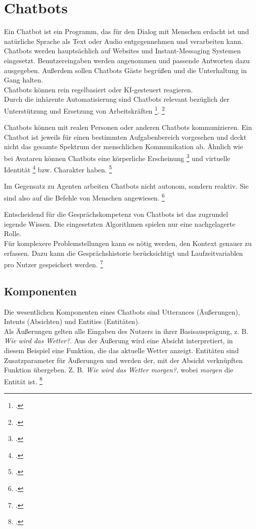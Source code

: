\section{Chatbots}
Ein Chatbot ist ein Programm, das für den Dialog mit Menschen erdacht ist und natürliche Sprache als Text oder Audio entgegennehmen und verarbeiten kann.
Chatbots werden hauptsächlich auf Websites und Instant-Messaging Systemen eingesetzt.
Benutzereingaben werden angenommen und passende Antworten dazu ausgegeben. Außerdem sollen Chatbots Gäste begrüßen und die Unterhaltung in Gang halten.\\
Chatbots können rein regelbasiert oder \acf{KI}-gesteuert reagieren.\\
Durch die inhärente Automatisierung sind Chatbots relevant bezüglich der \glqq{}Unterstützung und Ersetzung von Arbeitskräften\grqq
\footcite[][o. \pno]{Bendel_2018_Chatbot_Definition}{}.
\footcite[Vgl.][o. \pno]{Bendel_2018_Chatbot_Definition}

Chatbots können mit realen Personen oder anderen Chatbots kommunizieren. Ein Chatbot ist jeweils für einen bestimmten Aufgabenbereich vorgesehen und deckt nicht das gesamte Spektrum der menschlichen Kommunikation ab. Ähnlich wie bei Avataren können Chatbots eine \glqq{}körperliche Erscheinung\grqq
\footcite[][71\psq]{de_Vries_2006}
und \glqq{}virtuelle Identität\grqq
\footcite[][71\psq]{de_Vries_2006}
bzw. Charakter haben.
\footcite[Vgl.][71\psq]{de_Vries_2006}

Im Gegensatz zu Agenten arbeiten Chatbots nicht autonom, sondern reaktiv. Sie sind also auf die Befehle von Menschen angewiesen.
\footcite[Vgl.][69\psqq]{de_Vries_2006}

Entscheidend für die Gesprächskompetenz von Chatbots ist das zugrundel iegende Wissen. Die eingesetzten Algorithmen spielen nur eine nachgelagerte Rolle.\\
Für komplexere Problemstellungen  kann es nötig werden, den Kontext genauer zu erfassen. Dazu kann die Gesprächshistorie berücksichtigt und Laufzeitvariablen pro Nutzer gespeichert werden.
\footcite[Vgl.][82\psq]{Feindt_2006_Agenten}

\subsection{Komponenten}
Die wesentlichen Komponenten eines Chatbots sind Utterances (Äußerungen), Intents (Absichten) und Entities (Entitäten).\\
Als Äußerungen gelten alle Eingaben des Nutzers in ihrer Basisausprägung, z. B. \textit{Wie wird das Wetter?}.
Aus der Äußerung wird eine Absicht interpretiert, in diesem Beispiel eine Funktion, die das aktuelle Wetter anzeigt.
Entitäten sind Zusatzparameter für Äußerungen und werden der, mit der Absicht verknüpften Funktion übergeben. Z. B. \textit{Wie wird das Wetter morgen?}, wobei \textit{morgen} die Entität ist.
\footcite[Vgl.][51]{Groetz_2018_Sprich_mit_mir}

